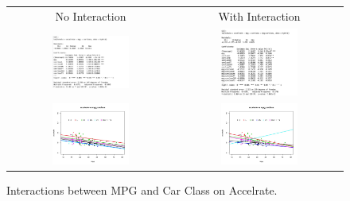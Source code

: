 \documentclass[acmsmall]{acmart}
\begin{document}
\begin{figure}[H] %
	\centering
	\begin{tabular}{p{} p{}}
	\hline
	\multicolumn{1}{|c|}{No Interaction} & \multicolumn{1}{|c|}{With Interaction} \\
		\multicolumn{1}{|c|}{\includegraphics[width=0.48\textwidth]{../graphics/ModAccMpgNoInt}} &
		\multicolumn{1}{|c|}{\includegraphics[width=0.48\textwidth]{../graphics/ModAccMpgInt}}\\
		\hline
		\hline
		\multicolumn{1}{|c|}{\includegraphics[width=0.48\textwidth]{../graphics/AccMpgNoInt}} &
		\multicolumn{1}{|c|}{\includegraphics[width=0.48\textwidth]{../graphics/AccMpgInt}}\\
		\hline
	\end{tabular}	
	\caption{Interactions between MPG and Car Class on Accelrate.} %
	\label{fig:INTMPG}
\end{figure}
\end{document}
